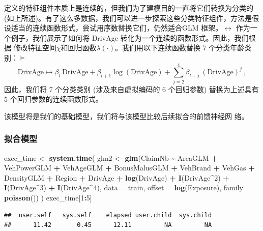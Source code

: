 \documentclass[
]{article}
\newenvironment{Shaded}{\begin{snugshade}}{\end{snugshade}}
\newcommand{\AttributeTok}[1]{\textcolor[rgb]{0.13,0.29,0.53}{#1}}
\newcommand{\DecValTok}[1]{\textcolor[rgb]{0.00,0.00,0.81}{#1}}
\newcommand{\FunctionTok}[1]{\textcolor[rgb]{0.13,0.29,0.53}{\textbf{#1}}}
\newcommand{\NormalTok}[1]{#1}
\newcommand{\OtherTok}[1]{\textcolor[rgb]{0.56,0.35,0.01}{#1}}
\newcommand{\SpecialCharTok}[1]{\textcolor[rgb]{0.81,0.36,0.00}{\textbf{#1}}}
\begin{document}
定义的特征组件本质上是连续的，但我们为了建模目的一直将它们转换为分类的(如上所述)。有了这么多数据，我们可以进一步探索这些分类特征组件，方法是假设适当的连续函数形式，尝试用序数替换它们，仍然适合GLM
框架。\(\leftrightarrow\) 作为一个例子，我们展示了如何将 DrivAge
转化为一个连续的函数形式。因此，我们根据
修改特征空间\(\chi\)和回归函数\(\lambda(\cdot)\)。我们用以下连续函数替换
7 个分类年龄类别：\(\models\)
\[\mathrm{DrivAge}\mapsto\beta_{l}\:\mathrm{DrivAge}+\beta_{l+1}\log(\mathrm{DrivAge})+\sum_{j=2}^{4}\beta_{l+j}\:(\mathrm{DrivAge})^{j}\:,\]
因此，我们将 7 个分类类别 (涉及来自虚拟编码的 6 个回归参数)
替换为上述具有 5 个回归参数的连续函数形式。

该模型将是我们的基础模型，我们将与该模型比较后续拟合的前馈神经网 络。

\subsubsection{拟合模型}\label{ux62dfux5408ux6a21ux578b}

\begin{Shaded}
\begin{Highlighting}[]
\NormalTok{exec\_time }\OtherTok{\textless{}{-}} \FunctionTok{system.time}\NormalTok{(}
\NormalTok{  glm2 }\OtherTok{\textless{}{-}} \FunctionTok{glm}\NormalTok{(ClaimNb }\SpecialCharTok{\textasciitilde{}}\NormalTok{ AreaGLM }\SpecialCharTok{+}\NormalTok{ VehPowerGLM }\SpecialCharTok{+}\NormalTok{ VehAgeGLM }\SpecialCharTok{+}\NormalTok{ BonusMalusGLM }\SpecialCharTok{+}
\NormalTok{                VehBrand }\SpecialCharTok{+}\NormalTok{ VehGas }\SpecialCharTok{+}\NormalTok{ DensityGLM }\SpecialCharTok{+}\NormalTok{ Region }\SpecialCharTok{+}\NormalTok{ DrivAge }\SpecialCharTok{+} 
                \FunctionTok{log}\NormalTok{(DrivAge) }\SpecialCharTok{+} \FunctionTok{I}\NormalTok{(DrivAge}\SpecialCharTok{\^{}}\DecValTok{2}\NormalTok{) }\SpecialCharTok{+} \FunctionTok{I}\NormalTok{(DrivAge}\SpecialCharTok{\^{}}\DecValTok{3}\NormalTok{) }\SpecialCharTok{+} \FunctionTok{I}\NormalTok{(DrivAge}\SpecialCharTok{\^{}}\DecValTok{4}\NormalTok{),}
              \AttributeTok{data =}\NormalTok{ train, }\AttributeTok{offset =} \FunctionTok{log}\NormalTok{(Exposure), }\AttributeTok{family =} \FunctionTok{poisson}\NormalTok{())}
\NormalTok{)}
\NormalTok{exec\_time[}\DecValTok{1}\SpecialCharTok{:}\DecValTok{5}\NormalTok{]}
\end{Highlighting}
\end{Shaded}

\begin{verbatim}
##  user.self   sys.self    elapsed user.child  sys.child 
##      11.42       0.45      12.11         NA         NA
\end{verbatim}
\end{document}
